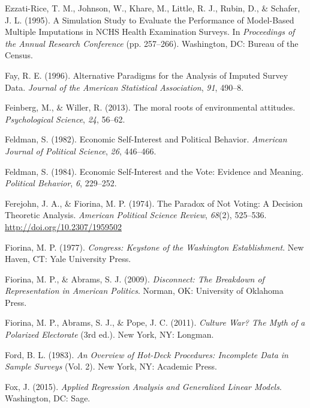 \documentclass[12pt,econ]{sources/authesis}
\begin{document}
\leavevmode\hypertarget{ref-ezzati-rice_1995_simulation}{}%
Ezzati-Rice, T. M., Johnson, W., Khare, M., Little, R. J., Rubin, D., \& Schafer, J. L. (1995). A Simulation Study to Evaluate the Performance of Model-Based Multiple Imputations in NCHS Health Examination Surveys. In \emph{Proceedings of the Annual Research Conference} (pp. 257--266). Washington, DC: Bureau of the Census.

\leavevmode\hypertarget{ref-fay_1996_alternative}{}%
Fay, R. E. (1996). Alternative Paradigms for the Analysis of Imputed Survey Data. \emph{Journal of the American Statistical Association}, \emph{91}, 490--8.

\leavevmode\hypertarget{ref-feinberg_2013_moral}{}%
Feinberg, M., \& Willer, R. (2013). The moral roots of environmental attitudes. \emph{Psychological Science}, \emph{24}, 56--62.

\leavevmode\hypertarget{ref-feldman_economic_1982}{}%
Feldman, S. (1982). Economic Self-Interest and Political Behavior. \emph{American Journal of Political Science}, \emph{26}, 446--466.

\leavevmode\hypertarget{ref-feldman_economic_1984}{}%
Feldman, S. (1984). Economic Self-Interest and the Vote: Evidence and Meaning. \emph{Political Behavior}, \emph{6}, 229--252.

\leavevmode\hypertarget{ref-ferejohn_paradox_1974}{}%
Ferejohn, J. A., \& Fiorina, M. P. (1974). The Paradox of Not Voting: A Decision Theoretic Analysis. \emph{American Political Science Review}, \emph{68}(2), 525--536. \url{http://doi.org/10.2307/1959502}

\leavevmode\hypertarget{ref-fiorina_congress:_1977}{}%
Fiorina, M. P. (1977). \emph{Congress: Keystone of the Washington Establishment}. New Haven, CT: Yale University Press.

\leavevmode\hypertarget{ref-fiorina_disconnect_2009}{}%
Fiorina, M. P., \& Abrams, S. J. (2009). \emph{Disconnect: The Breakdown of Representation in American Politics}. Norman, OK: University of Oklahoma Press.

\leavevmode\hypertarget{ref-fiorina_culture_2011}{}%
Fiorina, M. P., Abrams, S. J., \& Pope, J. C. (2011). \emph{Culture War? The Myth of a Polarized Electorate} (3rd ed.). New York, NY: Longman.

\leavevmode\hypertarget{ref-ford_1983_overview}{}%
Ford, B. L. (1983). \emph{An Overview of Hot-Deck Procedures: Incomplete Data in Sample Surveys} (Vol. 2). New York, NY: Academic Press.

\leavevmode\hypertarget{ref-fox_applied_2015}{}%
Fox, J. (2015). \emph{Applied Regression Analysis and Generalized Linear Models}. Washington, DC: Sage.
\end{document}
